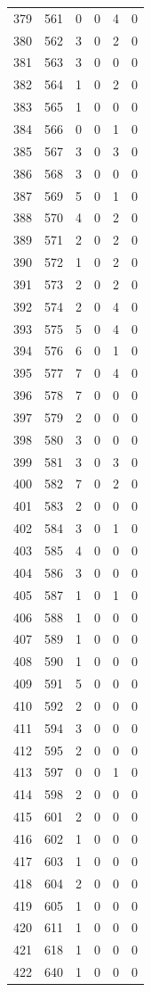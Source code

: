 \documentclass[
  letterpaper,
  DIV=11,
  numbers=noendperiod]{scrreprt}
\begin{document}
\begin{longtable}[]{@{}rrrrrr@{}}
379 & 561 & 0 & 0 & 4 & 0 \\
380 & 562 & 3 & 0 & 2 & 0 \\
381 & 563 & 3 & 0 & 0 & 0 \\
382 & 564 & 1 & 0 & 2 & 0 \\
383 & 565 & 1 & 0 & 0 & 0 \\
384 & 566 & 0 & 0 & 1 & 0 \\
385 & 567 & 3 & 0 & 3 & 0 \\
386 & 568 & 3 & 0 & 0 & 0 \\
387 & 569 & 5 & 0 & 1 & 0 \\
388 & 570 & 4 & 0 & 2 & 0 \\
389 & 571 & 2 & 0 & 2 & 0 \\
390 & 572 & 1 & 0 & 2 & 0 \\
391 & 573 & 2 & 0 & 2 & 0 \\
392 & 574 & 2 & 0 & 4 & 0 \\
393 & 575 & 5 & 0 & 4 & 0 \\
394 & 576 & 6 & 0 & 1 & 0 \\
395 & 577 & 7 & 0 & 4 & 0 \\
396 & 578 & 7 & 0 & 0 & 0 \\
397 & 579 & 2 & 0 & 0 & 0 \\
398 & 580 & 3 & 0 & 0 & 0 \\
399 & 581 & 3 & 0 & 3 & 0 \\
400 & 582 & 7 & 0 & 2 & 0 \\
401 & 583 & 2 & 0 & 0 & 0 \\
402 & 584 & 3 & 0 & 1 & 0 \\
403 & 585 & 4 & 0 & 0 & 0 \\
404 & 586 & 3 & 0 & 0 & 0 \\
405 & 587 & 1 & 0 & 1 & 0 \\
406 & 588 & 1 & 0 & 0 & 0 \\
407 & 589 & 1 & 0 & 0 & 0 \\
408 & 590 & 1 & 0 & 0 & 0 \\
409 & 591 & 5 & 0 & 0 & 0 \\
410 & 592 & 2 & 0 & 0 & 0 \\
411 & 594 & 3 & 0 & 0 & 0 \\
412 & 595 & 2 & 0 & 0 & 0 \\
413 & 597 & 0 & 0 & 1 & 0 \\
414 & 598 & 2 & 0 & 0 & 0 \\
415 & 601 & 2 & 0 & 0 & 0 \\
416 & 602 & 1 & 0 & 0 & 0 \\
417 & 603 & 1 & 0 & 0 & 0 \\
418 & 604 & 2 & 0 & 0 & 0 \\
419 & 605 & 1 & 0 & 0 & 0 \\
420 & 611 & 1 & 0 & 0 & 0 \\
421 & 618 & 1 & 0 & 0 & 0 \\
422 & 640 & 1 & 0 & 0 & 0 \\
\end{longtable}
\end{document}
